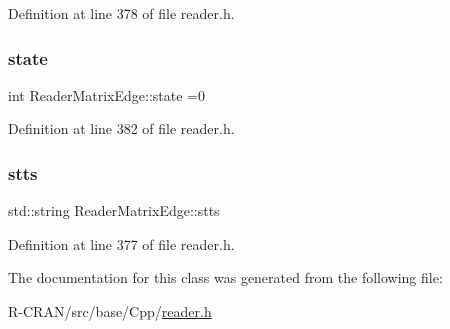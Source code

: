 Definition at line 378 of file reader.\+h.

\mbox{\label{classReaderMatrixEdge_aa2c426f8207b7317ed84941d712ed0f0}} 
\subsubsection{\texorpdfstring{state}{state}}
{\footnotesize\ttfamily int Reader\+Matrix\+Edge\+::state =0\hspace{0.3cm}{\ttfamily [private]}}



Definition at line 382 of file reader.\+h.

\mbox{\label{classReaderMatrixEdge_aabdc3b2ee9060a35c7e6b04afcebf9f9}} 
\subsubsection{\texorpdfstring{stts}{stts}}
{\footnotesize\ttfamily std\+::string Reader\+Matrix\+Edge\+::stts\hspace{0.3cm}{\ttfamily [private]}}



Definition at line 377 of file reader.\+h.



The documentation for this class was generated from the following file\+:\begin{DoxyCompactItemize}
\item 
R-\/\+C\+R\+A\+N/src/base/\+Cpp/\hyperlink{reader_8h}{reader.\+h}\end{DoxyCompactItemize}
